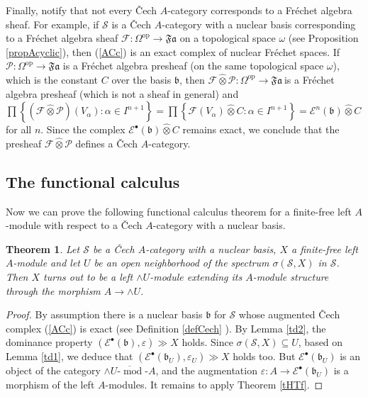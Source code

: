 \documentclass[12pt]{amsart}%
\newtheorem{theorem}{Theorem}
\theoremstyle{plain}
\numberwithin{equation}{section}
\numberwithin{equation}{section}
\numberwithin{theorem}{section}
\numberwithin{lemma}{section}
\numberwithin{remark}{section}
\numberwithin{example}{section}
\numberwithin{proposition}{section}
\numberwithin{definition}{section}
\numberwithin{corollary}{section}
\begin{document}
Finally, notify that not every \v{C}ech $A$-category corresponds to a
Fr\'{e}chet algebra sheaf. For example, if $\mathcal{S}$ is a\textit{
}\v{C}ech $A$-category with a nuclear basis corresponding to a Fr\'{e}chet
algebra sheaf $\mathcal{F}:\Omega^{\operatorname{op}}\rightarrow\mathfrak{Fa}$
on a topological space $\omega$ (see Proposition \ref{propAcyclic}), then
(\ref{ACc}) is an exact complex of nuclear Fr\'{e}chet spaces. If
$\mathcal{P}:\Omega^{\operatorname{op}}\rightarrow\mathfrak{Fa}$ is a
Fr\'{e}chet algebra presheaf (on the same topological space $\omega$), which
is the constant $C$ over the basis $\mathfrak{b}$, then $\mathcal{F}%
\widehat{\otimes}\mathcal{P}:\Omega^{\operatorname{op}}\rightarrow
\mathcal{\mathfrak{Fa}\ }$is a Fr\'{e}chet algebra presheaf (which is not a
sheaf in general) and $\prod\left\{  \left(  \mathcal{F}\widehat{\otimes
}\mathcal{P}\right)  \left(  V_{\alpha}\right)  :\alpha\in I^{n+1}\right\}
=\prod\left\{  \mathcal{F}\left(  V_{\alpha}\right)  \widehat{\otimes}%
C:\alpha\in I^{n+1}\right\}  =\mathcal{E}^{n}\left(  \mathfrak{b}\right)
\widehat{\otimes}C$ for all $n$. Since the complex $\mathcal{E}^{\bullet
}\left(  \mathfrak{b}\right)  \widehat{\otimes}C$ remains exact, we conclude
that the presheaf $\mathcal{F}\widehat{\otimes}\mathcal{P}$ defines a\textit{
}\v{C}ech $A$-category.

\subsection{The functional calculus}

Now we can prove the following functional calculus theorem for a finite-free
left $A$-module with respect to a \v{C}ech $A$-category with a nuclear basis.

\begin{theorem}
\label{thcoreFC}Let $\mathcal{S}$ be a \v{C}ech $A$-category with a nuclear
basis, $X$ a finite-free left $A$-module and let $U$ be an open neighborhood
of the spectrum $\sigma\left(  \mathcal{S},X\right)  $ in $\mathcal{S}$. Then
$X$ turns out to be a left $\wedge U$-module extending its $A$-module
structure through the morphism $A\rightarrow\wedge U$.
\end{theorem}

\begin{proof}
By assumption there is a nuclear basis $\mathfrak{b}$ for $\mathcal{S}$ whose
augmented \v{C}ech complex (\ref{ACc}) is exact (see Definition \ref{defCech}%
). By Lemma \ref{td2}, the dominance property $\left(  \mathcal{E}^{\bullet
}\left(  \mathfrak{b}\right)  ,\varepsilon\right)  \gg X$ holds. Since
$\sigma\left(  \mathcal{S},X\right)  \subseteq U$, based on Lemma \ref{td1},
we deduce that $\left(  \mathcal{E}^{\bullet}\left(  \mathfrak{b}_{U}\right)
,\varepsilon_{U}\right)  \gg X$ holds too. But $\mathcal{E}^{\bullet}\left(
\mathfrak{b}_{U}\right)  $ is an object of the category $\overline{\wedge
U\text{-}\operatorname*{mod}\text{-}A}$, and the augmentation $\varepsilon
:A\rightarrow\mathcal{E}^{\bullet}\left(  \mathfrak{b}_{U}\right)  $ is a
morphism of the left $A$-modules. It remains to apply Theorem \ref{tHTf}.
\end{proof}
\end{document}
